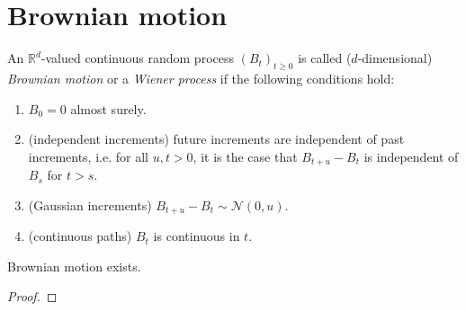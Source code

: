 \documentclass[12pt]{article}
\begin{document}

\section{Brownian motion} %

\begin{definition}
	An $\mathbb{R}^d$-valued continuous random process $(B_t)_{t\geq 0}$ is called ($d$-dimensional) \emph{Brownian motion} or a \emph{Wiener process} if the following conditions hold:
	\begin{enumerate}[label=BR\arabic*),ref=BR\arabic*]
		\item $B_0=0$ almost surely.
		\item (independent increments) future increments are independent of past increments, i.e. for all $u,t>0$, it is the case that $B_{t+u}-B_t$ is independent of $B_s$ for $t>s$.
		\item (Gaussian increments) $B_{t+u}-B_t \sim \mathcal{N}(0,u)$.
		\item (continuous paths) $B_t$ is continuous in $t$.
	\end{enumerate}
\end{definition}

\begin{theorem}
	Brownian motion exists.
\end{theorem}
\begin{proof}
\end{proof}


\nocite{legall_2022}
\nocite{wikipedia_wiener_process}
\printbibliography
\end{document}
